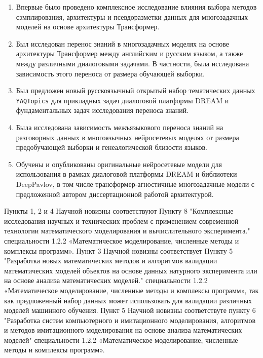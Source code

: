 {\novelty}
\begin{enumerate}
  \item Впервые было проведено комплексное исследование влияния выбора методов сэмплирования, архитектуры и псевдоразметки данных для многозадачных моделей на основе архитектуры Трансформер.
  \item Был исследован перенос знаний в многозадачных моделях на основе архитектуры Трансформер между английским и русским языком, а также между различными диалоговыми задачами. В частности, была исследована зависимость этого переноса от размера обучающей выборки.
  \item Был предложен новый русскоязычный открытый набор тематических данных \texttt{YAQTopics} для прикладных задач диалоговой платформы DREAM и фундаментальных задач исследования переноса знаний.
  \item Была исследована зависимость межъязыкового переноса знаний на разговорных данных в многоязычных нейросетевых моделях от размера предобучающей выборки и генеалогической близости языков.
  \item Обучены и опубликованы оригинальные нейросетевые модели для использования в рамках диалоговой платформы DREAM и библиотеки DeepPavlov, в том числе трансформер-агностичные многозадачные модели с предложенной автором диссертационной работой архитектурой.
\end{enumerate}

{\appropriation}
Пункты 1, 2 и 4 Научной новизны соответствуют Пункту 8 "Комплексные исследования научных и технических проблем с применением современной технологии математического моделирования и
вычислительного эксперимента." специальности 1.2.2 «Математическое моделирование, численные методы и комплексы программ». Пункт 3 Научной новизны соответствует Пункту 5 "Разработка новых математических методов и алгоритмов валидации математических моделей объектов на основе данных натурного эксперимента или на основе анализа математических моделей." специальности 1.2.2 «Математическое моделирование, численные методы и комплексы программ», так как предложенный набор данных может использовать для валидации различных моделей машинного обучения. Пункт 5 Научной новизны соответствуте пункту 6 "Разработка систем компьютерного и имитационного моделирования, алгоритмов и методов имитационного моделирования на основе анализа математических моделей" специальности 1.2.2 «Математическое моделирование, численные методы и комплексы программ».


